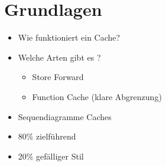 \chapter{Grundlagen}
\label{cha:grundlagen}

\begin{itemize}
\item Wie funktioniert ein Cache?
\item Welche Arten gibt es ?
\begin{itemize}
\item Store Forward 
\item Function Cache (klare Abgrenzung)
\end{itemize}
\item Sequendiagramme Caches
\end{itemize}

\begin{itemize}
\item 80\% zielführend
\item 20\% gefälliger Stil
\end{itemize}
